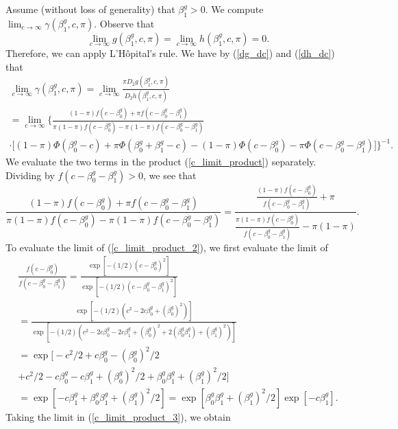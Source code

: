 \documentclass[11pt]{article}
\begin{document}
\begin{appendices}
\begin{refsection}
Assume (without loss of generality) that $\beta^g_1 > 0$. We compute $\lim_{c \to \infty} \gamma(\beta^g_1, c, \pi)$. Observe that $$\lim_{c \to \infty} g(\beta^g_1, c, \pi) = \lim_{c \to \infty} h(\beta^g_1, c, \pi)  = 0.$$ Therefore, we can apply L'H\^{o}pital's rule. We have by (\ref{dg_dc}) and (\ref{dh_dc}) that \begin{multline}\label{c_limit_product}
\lim_{c \to \infty} \gamma(\beta^g_1, c, \pi) = \lim_{c \to \infty} \frac{\pi D_2 g(\beta^g_1, c, \pi)}{D_2h(\beta^g_1, c, \pi)} \\ = \lim_{c \to \infty} \bigg\{ \frac{(1-\pi) f(c - \beta^g_0) + \pi f(c - \beta^g_0 - \beta^g_1)}{\pi (1-\pi) f(c - \beta^g_0) - \pi (1-\pi)f(c - \beta^g_0 - \beta^g_1)} \\ \cdot \bigg[ (1-\pi) \Phi(\beta_0^g - c) + \pi \Phi(\beta^g_0 + \beta^g_1 - c) - (1-\pi) \Phi(c - \beta^g_0) - \pi \Phi(c - \beta_0^g - \beta_1^g) \bigg] \bigg\}^{-1}.
 \end{multline}
 We evaluate the two terms in the product (\ref{c_limit_product}) separately. Dividing by $f(c - \beta^g_0 - \beta^g_1) > 0$, we see that
 \begin{equation}\label{c_limit_product_2}
 \frac{(1-\pi) f(c - \beta^g_0) + \pi f(c - \beta^g_0 - \beta^g_1)}{\pi (1-\pi) f(c - \beta^g_0) - \pi (1-\pi)f(c - \beta^g_0 - \beta^g_1)} = \frac{\frac{(1-\pi) f(c - \beta^g_0)}{ f(c - \beta^g_0 - \beta^g_1)} + \pi}{\frac{ \pi(1-\pi) f(c - \beta^g_0)}{ f(c - \beta^g_0 - \beta^g_1)} - \pi(1-\pi)}.
 \end{equation}
 To evaluate the limit of (\ref{c_limit_product_2}), we first evaluate the limit of
 \begin{multline}\label{c_limit_product_3}
 \frac{f(c - \beta^g_0)}{f(c - \beta^g_0 - \beta^g_1)} = \frac{\exp{[-(1/2)(c - \beta_0^g)^2]}}{\exp{[-(1/2)( c - \beta^g_0 - \beta^g_1)^2]}} \\ = \frac{\exp[ -(1/2)(c^2 - 2 c \beta^g_0 + (\beta^g_0)^2)]}{\exp\left[-(1/2)( c^2 - 2c \beta^g_0 - 2 c \beta^g_1 + (\beta^g_0)^2 + 2( \beta^g_0 \beta^g_1) + (\beta^g_1)^2)\right]} \\ = \exp\big[-c^2/2 + c \beta^g_0 - (\beta^g_0)^2/2 \\ + c^2/2 - c \beta^g_0 - c \beta^g_1 + (\beta^g_0)^2/2 + \beta^g_0 \beta^g_1 + (\beta^g_1)^2/2 \big] \\ = \exp[ -c \beta^g_1 + \beta^g_0 \beta^g_1 + (\beta^g_1)^2/2] = \exp[ \beta^g_0 \beta^g_1 + (\beta^g_1)^2/2]\exp[ -c \beta^g_1]. 
\end{multline}
Taking the limit in (\ref{c_limit_product_3}), we obtain

\end{refsection}
\end{appendices}
\end{document}
